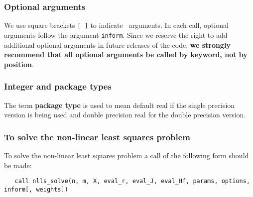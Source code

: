 \documentclass{spec}
\begin{document}
\hslarguments
\subsubsection{Optional arguments}\label{Optional arguments}

We use square brackets {\tt [ ]} to indicate \optional\ arguments.
In each
call, optional arguments follow the argument {\tt inform}.  Since we
reserve the right to add additional optional arguments in future
releases of the code, {\bf we strongly recommend that all optional
arguments be called by keyword, not by position}.

\subsubsection{Integer and package types}
The term {\bf package type} is used to mean
default real if the single precision version is being used and
double precision real for the double precision version.

\subsubsection{To solve the non-linear least squares problem}
\label{sec:solve}

To solve the non-linear least squares problem a call of the following form should be made:

\begin{verbatim}
   call nlls_solve(n, m, X, eval_r, eval_J, eval_Hf, params, options, inform[, weights])
\end{verbatim}
\end{document}
